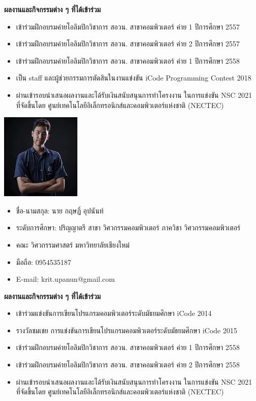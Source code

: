 \documentclass[semifinal]{cpecmu}
\begin{document}
\begin{biosketch}
\noindent \textbf{ผลงานและกิจกรรมต่าง ๆ ที่ได้เข้าร่วม}
\begin{itemize}
  \item เข้าร่วมฝึกอบรมค่ายโอลิมปิกวิชาการ สอวน. สาขาคอมพิวเตอร์ ค่าย 1 ปีการศึกษา 2557
  \item เข้าร่วมฝึกอบรมค่ายโอลิมปิกวิชาการ สอวน. สาขาคอมพิวเตอร์ ค่าย 2 ปีการศึกษา 2557
  \item เข้าร่วมฝึกอบรมค่ายโอลิมปิกวิชาการ สอวน. สาขาคอมพิวเตอร์ ค่าย 1 ปีการศึกษา 2558
  \item เป็น staff และผู้ช่วยกรรมการตัดสินในงานแข่งขัน iCode Programming Contest 2018
  \item ผ่านเข้ารอบนำเสนอผลงานและได้รับเงินสนับสนุนการทำโครงงาน ในการแข่งขัน NSC 2021\\
  ที่จัดขึ้นโดย ศูนย์เทคโนโลยีอิเล็กทรอนิกส์และคอมพิวเตอร์แห่งชาติ (NECTEC)
\end{itemize}
\newpage
\begin{center}
  \includegraphics[width=1.5in]{./images/krit_pic_resize.png}
\end{center}
\begin{itemize}[label={},leftmargin=*]
  \item ชื่อ-นามสกุล: นาย กฤษฏิ์ อุปนันท์
  \item ระดับการศึกษา: ปริญญาตรี สาขา วิศวกรรมคอมพิวเตอร์ ภาควิชา วิศวกรรมคอมพิวเตอร์
  \item คณะ วิศวกรรมศาสตร์ มหาวิทยาลัยเชียงใหม่
  \item มือถือ: 0954535187
  \item E-mail: krit.upanun@gmail.com
\end{itemize}


\noindent \textbf{ผลงานและกิจกรรมต่าง ๆ ที่ได้เข้าร่วม}
\begin{itemize}
  \item เข้าร่วมแข่งขันการเขียนโปรแกรมคอมพิวเตอร์ระดับมัธยมศึกษา iCode 2014
  \item รางวัลชมเชย การแข่งขันการเขียนโปรแกรมคอมพิวเตอร์ระดับมัธยมศึกษา iCode 2015
  \item เข้าร่วมฝึกอบรมค่ายโอลิมปิกวิชาการ สอวน. สาขาคอมพิวเตอร์ ค่าย 1 ปีการศึกษา 2558
  \item เข้าร่วมฝึกอบรมค่ายโอลิมปิกวิชาการ สอวน. สาขาคอมพิวเตอร์ ค่าย 2 ปีการศึกษา 2558
  \item ผ่านเข้ารอบนำเสนอผลงานและได้รับเงินสนับสนุนการทำโครงงาน ในการแข่งขัน NSC 2021\\
  ที่จัดขึ้นโดย ศูนย์เทคโนโลยีอิเล็กทรอนิกส์และคอมพิวเตอร์แห่งชาติ (NECTEC)
\end{itemize}

\end{biosketch}
\fi %
\end{document}
